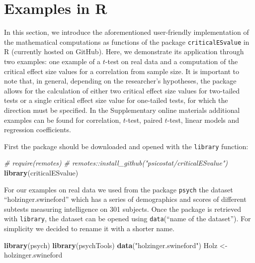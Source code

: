 \documentclass[
  man,floatsintext]{apa7}
\newenvironment{Shaded}{\begin{snugshade}}{\end{snugshade}}
\newcommand{\CommentTok}[1]{\textcolor[rgb]{0.56,0.35,0.01}{\textit{#1}}}
\newcommand{\FunctionTok}[1]{\textcolor[rgb]{0.13,0.29,0.53}{\textbf{#1}}}
\newcommand{\NormalTok}[1]{#1}
\newcommand{\OtherTok}[1]{\textcolor[rgb]{0.56,0.35,0.01}{#1}}
\newcommand{\StringTok}[1]{\textcolor[rgb]{0.31,0.60,0.02}{#1}}
\begin{document}
\normalsize

\hypertarget{examples-in-r}{%
\section{Examples in R}\label{examples-in-r}}

In this section, we introduce the aforementioned user-friendly implementation of the mathematical computations as functions of the package \texttt{criticalESvalue} in R (currently hosted on GitHub). Here, we demonstrate its application through two examples: one example of a \(t\)-test on real data and a computation of the critical effect size values for a correlation from sample size. It is important to note that, in general, depending on the researcher's hypotheses, the package allows for the calculation of either two critical effect size values for two-tailed tests or a single critical effect size value for one-tailed tests, for which the direction must be specified. In the Supplementary online materials additional examples can be found for correlation, \(t\)-test, paired \(t\)-test, linear models and regression coefficients.

First the package should be downloaded and opened with the \texttt{library} function:

\footnotesize

\begin{Shaded}
\begin{Highlighting}[]
\CommentTok{\# require(remotes)}
\CommentTok{\# remotes::install\_github("psicostat/criticalESvalue")}
\FunctionTok{library}\NormalTok{(criticalESvalue)}
\end{Highlighting}
\end{Shaded}

\normalsize

For our examples on real data we used from the package \texttt{psych} the dataset ``holzinger.swineford'' which has a series of demographics and scores of different subtests measuring intelligence on 301 subjects. Once the package is retrieved with \texttt{library}, the dataset can be opened using \texttt{data}(``name of the dataset''). For simplicity we decided to rename it with a shorter name.

\footnotesize

\begin{Shaded}
\begin{Highlighting}[]
\FunctionTok{library}\NormalTok{(psych)}
\FunctionTok{library}\NormalTok{(psychTools)}
\FunctionTok{data}\NormalTok{(}\StringTok{"holzinger.swineford"}\NormalTok{)}
\NormalTok{Holz }\OtherTok{\textless{}{-}}\NormalTok{ holzinger.swineford}
\end{Highlighting}
\end{Shaded}
\end{document}
